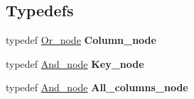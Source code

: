 \subsection*{Typedefs}
\begin{DoxyCompactItemize}
\item 
\mbox{\label{group__Data__Dictionary_ga18d16049867f49eea9781f2593b9ce5a}} 
typedef \mbox{\hyperlink{classOr__node}{Or\+\_\+node}} {\bfseries Column\+\_\+node}
\item 
\mbox{\label{group__Data__Dictionary_gad8f06001a129ced07c83ece7a3ef3f76}} 
typedef \mbox{\hyperlink{classAnd__node}{And\+\_\+node}} {\bfseries Key\+\_\+node}
\item 
\mbox{\label{group__Data__Dictionary_gafe5c31b4e7484950ef07cc7a5965edc1}} 
typedef \mbox{\hyperlink{classAnd__node}{And\+\_\+node}} {\bfseries All\+\_\+columns\+\_\+node}
\end{DoxyCompactItemize}
